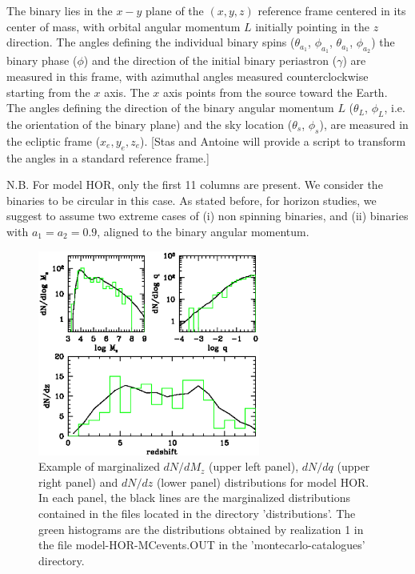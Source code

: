 \documentclass{iopart}
\begin{document}
The binary lies in the $x-y$ plane of the $(x,y,z)$ reference frame 
centered in its center of mass, with orbital angular momentum $L$ 
initially pointing in the $z$ direction. The angles defining the 
individual binary spins ($\theta_{a_{1}}$, $\phi_{a_{1}}$, $\theta_{a_{1}}$, 
$\phi_{a_{2}}$) the binary phase ($\phi$) and the direction of the
initial binary periastron ($\gamma$) are measured in this frame,
with azimuthal angles measured counterclockwise starting from 
the $x$ axis. The $x$ axis points from the source toward the Earth.
The angles defining the direction of the binary angular momentum $L$
($\theta_L$, $\phi_L$, i.e. the orientation of the binary plane)
and the sky location ($\theta_s$, $\phi_s$), are measured in the 
ecliptic frame ($x_e,y_e,z_e$). [Stas and Antoine will provide a 
script to transform the angles in a standard reference frame.]

N.B. For model  HOR, only the first 11 columns are present. We consider the binaries to be circular in this case. As stated before, for horizon
studies, we suggest to assume two extreme cases of (i) non spinning binaries,
and (ii) binaries with $a_1=a_2=0.9$, aligned to the binary angular momentum.

\begin{figure}[H]
\center
   \includegraphics[width=0.65\textwidth]{FigSMBHModSel/FIG_EXAMPLE_POP.eps}
\caption{Example of marginalized $dN/dM_z$ (upper left panel), $dN/dq$ (upper right panel) and $dN/dz$ (lower panel) distributions for model HOR. In each panel, the black lines are the marginalized distributions contained in the files located in the directory 'distributions'. The green histograms are the distributions obtained by realization 1 in the file model-HOR-MCevents.OUT in the 'montecarlo-catalogues' directory.
\label{F:MBHbMod:fig1} }
\end{figure}
\end{document}
